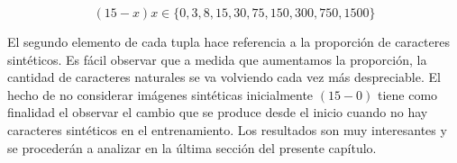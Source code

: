 	$$(15-x) x \in \{0,3,8,15,30,75,150,300,750,1500 \}$$
	
	El segundo elemento de cada tupla hace referencia a la proporción de caracteres sintéticos. Es fácil observar que a medida que aumentamos la proporción, la cantidad de caracteres naturales se va volviendo cada vez más despreciable. El hecho de no considerar imágenes sintéticas inicialmente $(15-0)$ tiene como finalidad el observar el cambio que se produce desde el inicio cuando no hay caracteres sintéticos en el entrenamiento. Los resultados son muy interesantes y se procederán a analizar en la última sección del presente capítulo.
	
